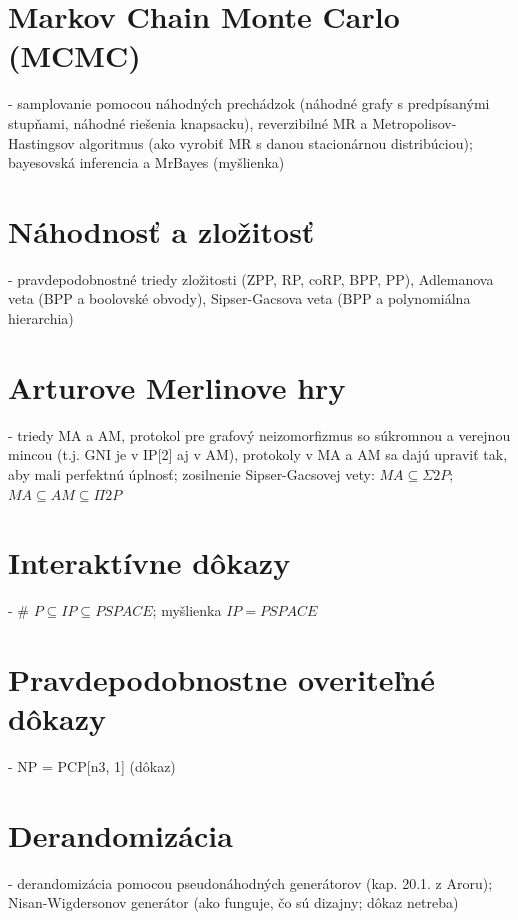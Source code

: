 \documentclass[12pt,a4paper]{article}
\begin{document}
\section{Markov Chain Monte Carlo (MCMC)}
 - samplovanie pomocou náhodných prechádzok (náhodné grafy s predpísanými stupňami, náhodné riešenia knapsacku), reverzibilné MR a Metropolisov-Hastingsov algoritmus (ako vyrobiť MR s danou stacionárnou distribúciou); bayesovská inferencia a MrBayes (myšlienka)
 

\section{Náhodnosť a zložitosť}
 - pravdepodobnostné triedy zložitosti (ZPP, RP, coRP, BPP, PP), Adlemanova veta (BPP a boolovské obvody), Sipser-Gacsova veta (BPP a polynomiálna hierarchia)
 

\section{Arturove Merlinove hry}
 - triedy MA a AM, protokol pre grafový neizomorfizmus so súkromnou a verejnou mincou (t.j. GNI je v IP[2] aj v AM), protokoly v MA a AM sa dajú upraviť tak, aby mali perfektnú úplnosť; zosilnenie Sipser-Gacsovej vety: $MA \subseteq \Sigma 2P$; $MA \subseteq AM \subseteq \Pi 2P$
 

\section{Interaktívne dôkazy}
 - \# $P \subseteq IP \subseteq PSPACE$; myšlienka $IP = PSPACE$
 

\section{Pravdepodobnostne overiteľné dôkazy}
 - NP = PCP[n3, 1] (dôkaz)
 

\section{Derandomizácia} 
- derandomizácia pomocou pseudonáhodných generátorov (kap. 20.1. z Aroru); Nisan-Wigdersonov generátor (ako funguje, čo sú dizajny; dôkaz netreba)
\end{document}

